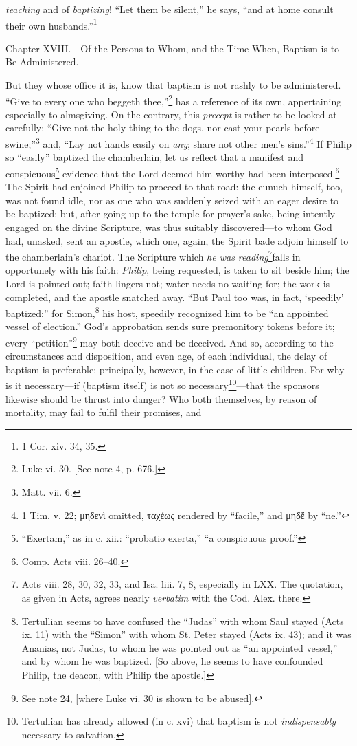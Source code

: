 \emph{teaching} and of \emph{baptizing}! “Let them be silent,” he says, “and at home consult their own husbands.”\footnote{1 Cor. xiv. 34, 35.}


Chapter XVIII.—Of the Persons to Whom, and the Time When, Baptism is to Be Administered.

But they whose office it is, know that baptism is not rashly to be administered. “Give to every one who beggeth thee,”\footnote{Luke vi. 30. [See note 4, p. 676.]} has a reference of its own, appertaining especially to almsgiving. On the contrary, this \emph{precept} is rather to be looked at carefully: “Give not the holy thing to the dogs, nor cast your pearls before swine;”\footnote{Matt. vii. 6.} and, “Lay not hands easily on \emph{any}; share not other men’s sins.”\footnote{1 Tim. v. 22; \textgreek{μηδενὶ} omitted, \textgreek{ταχέως} rendered by “facile,” and \textgreek{μηδἔ} by “ne.”} If Philip so “easily” baptized the chamberlain, let us reflect that a manifest and conspicuous\footnote{“Exertam,” as in c. xii.: “probatio exerta,” “a conspicuous proof.”} evidence that the Lord deemed him worthy had been interposed.\footnote{Comp. Acts viii. 26–40.} The Spirit had enjoined Philip to proceed to that road: the eunuch himself, too, was not found idle, nor as one who was suddenly seized with an eager desire to be baptized; but, after going up to the temple for prayer’s sake, being intently engaged on the divine Scripture, was thus suitably discovered—to whom God had, unasked, sent an apostle, which one, again, the Spirit bade adjoin himself to the chamberlain’s chariot. The Scripture which \emph{he was reading}\footnote{Acts viii. 28, 30, 32, 33, and Isa. liii. 7, 8, especially in LXX. The quotation, as given in Acts, agrees nearly \emph{verbatim} with the Cod. Alex. there.}falls in opportunely with his faith: \emph{Philip}, being requested, is taken to sit beside him; the Lord is pointed out; faith lingers not; water needs no waiting for; the work is completed, and the apostle snatched away. “But Paul too was, in fact, ‘speedily’ baptized:” for Simon,\footnote{Tertullian seems to have confused the “Judas” with whom Saul stayed (Acts ix. 11) with the “Simon” with whom St. Peter stayed (Acts ix. 43); and it was Ananias, not Judas, to whom he was pointed out as “an appointed vessel,” and by whom he was baptized. [So above, he seems to have confounded Philip, the deacon, with Philip the apostle.]} his host, speedily recognized him to be “an appointed vessel of election.” God’s approbation sends sure premonitory tokens before it; every “petition”\footnote{See note 24, [where Luke vi. 30 is shown to be abused].} may both deceive and be deceived. And so, according to the circumstances and disposition, and even age, of each individual, the delay of baptism is preferable; principally, however, in the case of little children. For why is it necessary—if (baptism itself) is not so necessary\footnote{Tertullian has already allowed (in c. xvi) that baptism is not \emph{indispensably} necessary to salvation.}—that the sponsors likewise should be thrust into danger? Who both themselves, by reason of mortality, may fail to fulfil their promises, and 